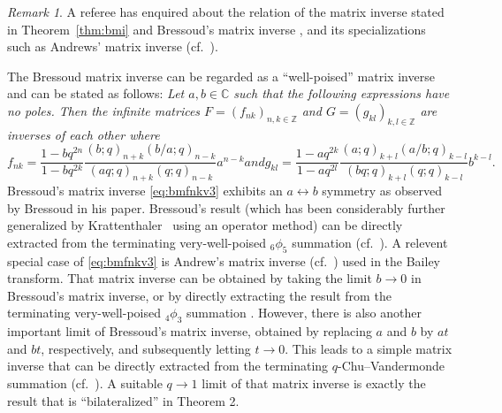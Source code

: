 \documentclass[reqno,12pt]{amsart}
\theoremstyle{remark}
\newtheorem{remark}{Remark}
\numberwithin{equation}{section}
\begin{document}
\begin{remark}
A referee has enquired about the relation of the matrix inverse
stated in Theorem~\ref{thm:bmi} and Bressoud's matrix inverse \cite{Br},
and its specializations such as Andrews' matrix inverse (cf.\ \cite{A2}).

The Bressoud matrix inverse can be regarded as a ``well-poised''
matrix inverse and can be stated as follows:
\textit{Let $a,b\in\mathbb C$ such that the following expressions
  have no poles. Then the infinite matrices 
$F=(f_{nk})_{n,k\in\mathbb Z}$ and $G=(g_{kl})_{k,l\in\mathbb Z}$ are
\textit{inverses} of each other where}
\begin{subequations}\label{eq:bmfnkv3}
\begin{equation}
f_{nk}=\frac{1-bq^{2n}}{1-bq^{2k}}\frac{(b;q)_{n+k}(b/a;q)_{n-k}}
{(aq;q)_{n+k}(q;q)_{n-k}}a^{n-k}
\end{equation}
and
\begin{equation}
g_{kl}=\frac{1-aq^{2k}}{1-aq^{2l}}\frac{(a;q)_{k+l}(a/b;q)_{k-l}}
{(bq;q)_{k+l}(q;q)_{k-l}}b^{k-l}.
\end{equation}
\end{subequations}
Bressoud's matrix inverse \eqref{eq:bmfnkv3}
exhibits an $a\leftrightarrow b$ symmetry as observed by Bressoud
in his paper. Bressoud's result (which has been considerably further
generalized by Krattenthaler~\cite{Kr} using an operator method)
can be directly extracted from the
terminating very-well-poised $_6\phi_5$ summation
(cf.\ \cite[Equation (II.21)]{GR}). A relevent special case of
\eqref{eq:bmfnkv3} is Andrew's matrix inverse (cf.\ \cite{A2})
used in the Bailey transform. That matrix inverse can
be obtained by taking the limit $b\to 0$ in Bressoud's matrix inverse,
or by directly extracting the result from the terminating
very-well-poised $_4\phi_3$ summation
\cite[$c\to aq/b$ in Equation (II.21)]{GR}.
However, there is also another important limit of Bressoud's matrix inverse,
obtained by replacing $a$ and $b$ by $at$ and $bt$, respectively,
and subsequently letting $t\to 0$. This leads to a simple
matrix inverse that can be directly extracted from
the terminating $q$-Chu--Vandermonde summation
(cf.\ \cite[Equation (II.6)]{GR}).
A suitable $q\to 1$ limit of that matrix inverse is exactly
the result that is ``bilateralized'' in Theorem 2.
\end{remark}
\end{document}
